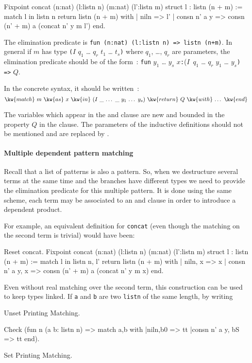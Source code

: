 \begin{coq_example}
Fixpoint concat (n:nat) (l:listn n) (m:nat) (l':listn m) {struct l} :
 listn (n + m) :=
  match l in listn n return listn (n + m) with
  | niln => l'
  | consn n' a y => consn (n' + m) a (concat n' y m l')
  end.
\end{coq_example}
The elimination predicate is {\tt fun (n:nat) (l:listn n) => listn~(n+m)}.
In general if $m$ has type {\tt (}$I$ $q_1$ {\ldots} $q_r$ $t_1$ {\ldots} $t_s${\tt )} where
$q_1$, {\ldots}, $q_r$ are parameters, the elimination predicate should be of
the form~:
{\tt fun} $y_1$ {\ldots} $y_s$ $x${\tt :}($I$~$q_1$ {\ldots} $q_r$ $y_1$ {\ldots}
  $y_s${\tt ) =>} $Q$.

In the concrete syntax, it should be written~:
\[ \kw{match}~m~\kw{as}~x~\kw{in}~(I~\_~\mbox{\ldots}~\_~y_1~\mbox{\ldots}~y_s)~\kw{return}~Q~\kw{with}~\mbox{\ldots}~\kw{end}\]

The variables which appear in the  and  clause are new
and bounded in the property $Q$ in the  clause. The
parameters of the inductive definitions should not be mentioned and
are replaced by \kw{\_}.

\paragraph{Multiple dependent pattern matching}
Recall that a list of patterns is also a pattern. So, when we destructure several
terms at the same time and the branches have different types we need to provide the
elimination predicate for this multiple pattern. It is done using the same
scheme, each term may be associated to an  and  clause in order to
introduce a dependent product.

For example, an equivalent definition for \texttt{concat} (even though the
matching on the second term is trivial) would have been:

\begin{coq_example}
Reset concat.
Fixpoint concat (n:nat) (l:listn n) (m:nat) (l':listn m) {struct l} :
 listn (n + m) :=
  match l in listn n, l' return listn (n + m) with
  | niln, x => x
  | consn n' a y, x => consn (n' + m) a (concat n' y m x)
  end.
\end{coq_example}

Even without real matching over the second term, this construction can be used to
keep types linked.  If {\tt a} and {\tt b} are two {\tt listn} of the same length,
by writing
\begin{coq_eval}
  Unset Printing Matching.
\end{coq_eval}
\begin{coq_example}
Check (fun n (a b: listn n) => match a,b with
 |niln,b0 => tt
 |consn n' a y, bS => tt
end).
\end{coq_example}
\begin{coq_eval}
  Set Printing Matching.
\end{coq_eval}


